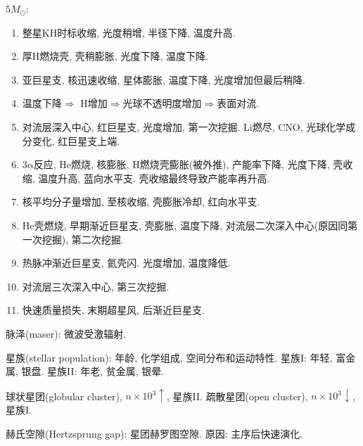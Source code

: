 $5M_\odot$:
\begin{enumerate}
    \item 整星KH时标收缩, 光度稍增, 半径下降, 温度升高.
    \item 厚$\text{H}$燃烧壳, 壳稍膨胀, 光度下降, 温度下降.
    \item 亚巨星支, 核迅速收缩, 星体膨胀, 温度下降, 光度增加但最后稍降.
    \item 温度下降$\Longrightarrow$ $\text{H}$增加$\Longrightarrow$光球不透明度增加$\Longrightarrow$表面对流.
    \item 对流层深入中心, 红巨星支, 光度增加, 第一次挖掘. $\text{Li}$燃尽, CNO, 光球化学成分变化, 红巨星支上端.
    \item 3$\mathrm{\alpha}$反应, $\text{He}$燃烧, 核膨胀, $\text{H}$燃烧壳膨胀(被外推), 产能率下降, 光度下降, 壳收缩, 温度升高, 蓝向水平支.  壳收缩最终导致产能率再升高.
    \item 核平均分子量增加, 至核收缩, 壳膨胀冷却, 红向水平支.
    \item $\text{He}$壳燃烧, 早期渐近巨星支, 壳膨胀, 温度下降, 对流层二次深入中心(原因同第一次挖掘), 第二次挖掘.
    \item 热脉冲渐近巨星支, 氦壳闪. 光度增加, 温度降低.
    \item 对流层三次深入中心, 第三次挖掘.
    \item 快速质量损失, 末期超星风, 后渐近巨星支.
\end{enumerate}

脉泽(maser): 微波受激辐射.

星族(stellar population): 年龄, 化学组成, 空间分布和运动特性. 星族I: 年轻, 富金属, 银盘. 星族II: 年老, 贫金属, 银晕.

球状星团(globular cluster), $n\times10^3\uparrow$, 星族II. 疏散星团(open cluster), $n\times10^3\downarrow$, 星族I.

赫氏空隙(Hertzsprung gap): 星团赫罗图空隙. 原因: 主序后快速演化.
